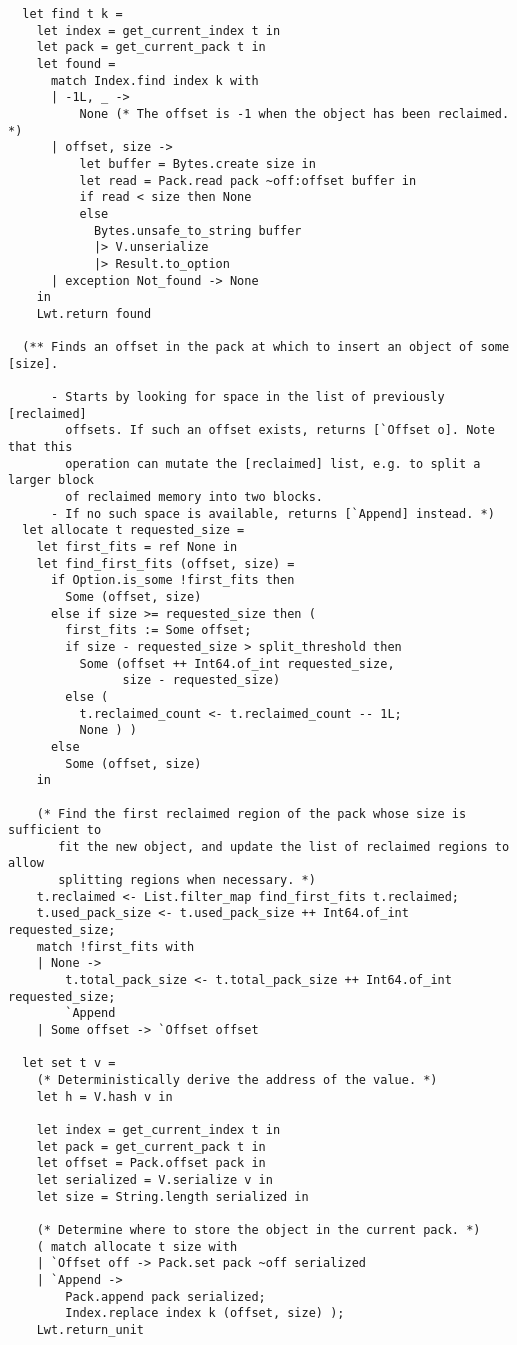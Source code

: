 \begin{verbatim}
  let find t k =
    let index = get_current_index t in
    let pack = get_current_pack t in
    let found =
      match Index.find index k with
      | -1L, _ ->
          None (* The offset is -1 when the object has been reclaimed. *)
      | offset, size ->
          let buffer = Bytes.create size in
          let read = Pack.read pack ~off:offset buffer in
          if read < size then None
          else
            Bytes.unsafe_to_string buffer
            |> V.unserialize
            |> Result.to_option
      | exception Not_found -> None
    in
    Lwt.return found

  (** Finds an offset in the pack at which to insert an object of some [size].

      - Starts by looking for space in the list of previously [reclaimed]
        offsets. If such an offset exists, returns [`Offset o]. Note that this
        operation can mutate the [reclaimed] list, e.g. to split a larger block
        of reclaimed memory into two blocks.
      - If no such space is available, returns [`Append] instead. *)
  let allocate t requested_size =
    let first_fits = ref None in
    let find_first_fits (offset, size) =
      if Option.is_some !first_fits then
        Some (offset, size)
      else if size >= requested_size then (
        first_fits := Some offset;
        if size - requested_size > split_threshold then
          Some (offset ++ Int64.of_int requested_size,
                size - requested_size)
        else (
          t.reclaimed_count <- t.reclaimed_count -- 1L;
          None ) )
      else
        Some (offset, size)
    in

    (* Find the first reclaimed region of the pack whose size is sufficient to
       fit the new object, and update the list of reclaimed regions to allow
       splitting regions when necessary. *)
    t.reclaimed <- List.filter_map find_first_fits t.reclaimed;
    t.used_pack_size <- t.used_pack_size ++ Int64.of_int requested_size;
    match !first_fits with
    | None ->
        t.total_pack_size <- t.total_pack_size ++ Int64.of_int requested_size;
        `Append
    | Some offset -> `Offset offset

  let set t v =
    (* Deterministically derive the address of the value. *)
    let h = V.hash v in

    let index = get_current_index t in
    let pack = get_current_pack t in
    let offset = Pack.offset pack in
    let serialized = V.serialize v in
    let size = String.length serialized in

    (* Determine where to store the object in the current pack. *)
    ( match allocate t size with
    | `Offset off -> Pack.set pack ~off serialized
    | `Append ->
        Pack.append pack serialized;
        Index.replace index k (offset, size) );
    Lwt.return_unit


\end{verbatim}
